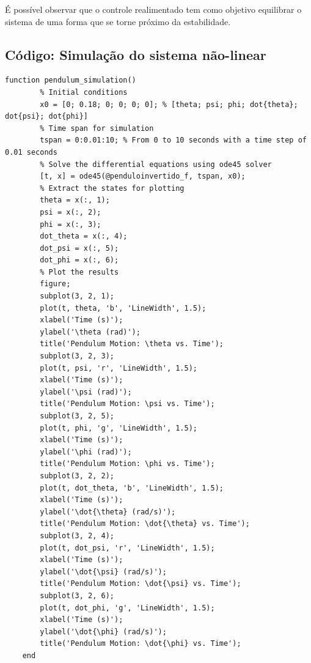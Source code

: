 \documentclass[10pt]{article}
\begin{document}
\quad É possível observar que o controle realimentado tem como objetivo equilibrar o sistema de uma forma que se torne próximo da estabilidade.

\newpage

\begin{appendices}

\section{Código: Simulação do sistema não-linear}

\begin{lstlisting}[caption={Código da simulação do sistema não-linear com ode45}, label=lst:pendulum_sim]
    function pendulum_simulation()
        % Initial conditions
        x0 = [0; 0.18; 0; 0; 0; 0]; % [theta; psi; phi; dot{theta}; dot{psi}; dot{phi}]
        % Time span for simulation
        tspan = 0:0.01:10; % From 0 to 10 seconds with a time step of 0.01 seconds
        % Solve the differential equations using ode45 solver
        [t, x] = ode45(@penduloinvertido_f, tspan, x0);
        % Extract the states for plotting
        theta = x(:, 1);
        psi = x(:, 2);
        phi = x(:, 3);
        dot_theta = x(:, 4);
        dot_psi = x(:, 5);
        dot_phi = x(:, 6);
        % Plot the results
        figure;
        subplot(3, 2, 1);
        plot(t, theta, 'b', 'LineWidth', 1.5);
        xlabel('Time (s)');
        ylabel('\theta (rad)');
        title('Pendulum Motion: \theta vs. Time');
        subplot(3, 2, 3);
        plot(t, psi, 'r', 'LineWidth', 1.5);
        xlabel('Time (s)');
        ylabel('\psi (rad)');
        title('Pendulum Motion: \psi vs. Time');
        subplot(3, 2, 5);
        plot(t, phi, 'g', 'LineWidth', 1.5);
        xlabel('Time (s)');
        ylabel('\phi (rad)');
        title('Pendulum Motion: \phi vs. Time');
        subplot(3, 2, 2);
        plot(t, dot_theta, 'b', 'LineWidth', 1.5);
        xlabel('Time (s)');
        ylabel('\dot{\theta} (rad/s)');
        title('Pendulum Motion: \dot{\theta} vs. Time');
        subplot(3, 2, 4);
        plot(t, dot_psi, 'r', 'LineWidth', 1.5);
        xlabel('Time (s)');
        ylabel('\dot{\psi} (rad/s)');
        title('Pendulum Motion: \dot{\psi} vs. Time');
        subplot(3, 2, 6);
        plot(t, dot_phi, 'g', 'LineWidth', 1.5);
        xlabel('Time (s)');
        ylabel('\dot{\phi} (rad/s)');
        title('Pendulum Motion: \dot{\phi} vs. Time');
    end


\end{lstlisting}
\end{appendices}
\end{document}
